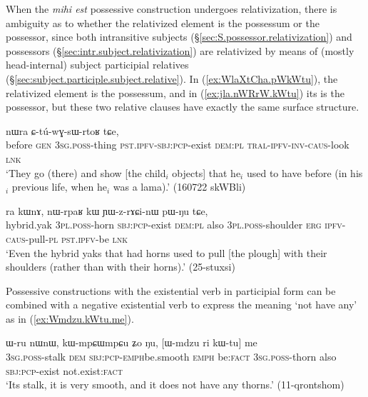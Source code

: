 When the \textit{mihi est} possessive construction undergoes relativization, there is ambiguity as to whether the relativized element is the possessum or the possessor, since both intransitive subjects (§\ref{sec:S.possessor.relativization}) and possessors (§\ref{sec:intr.subject.relativization}) are relativized by means of (mostly head-internal) subject participial relatives (§\ref{sec:subject.participle.subject.relative}). In (\ref{ex:WlaXtCha.pWkWtu}), the relativized element is the possessum, and in (\ref{ex:jla.nWRrW.kWtu}) its is the possessor, but these two relative clauses have exactly the same surface structure.
 
 \begin{exe}
\ex \label{ex:WlaXtCha.pWkWtu}
 nɯra ɕ-tú-wɣ-sɯ-rtoʁ tɕe, \\
before \textsc{gen} \textsc{3sg}.\textsc{poss}-thing \textsc{pst}.\textsc{ipfv}-\textsc{sbj}:\textsc{pcp}-exist \textsc{dem}:\textsc{pl} \textsc{tral}-\textsc{ipfv}-\textsc{inv}-\textsc{caus}-look \textsc{lnk} \\
\glt `They go (there) and show [the child$_i$ objects] that he$_i$ used to have before (in his$_i$ previous life, when he$_i$ was a lama).' (160722 skWBli)
 \end{exe}
 
\begin{exe}
\ex \label{ex:jla.nWRrW.kWtu}
 ra kɯnɤ, nɯ-rpaʁ kɯ ɲɯ-z-rɤɕi-nɯ pɯ-ŋu tɕe, \\
hybrid.yak \textsc{3pl}.\textsc{poss}-horn \textsc{sbj}:\textsc{pcp}-exist \textsc{dem}:\textsc{pl} also \textsc{3pl}.\textsc{poss}-shoulder \textsc{erg} \textsc{ipfv}-\textsc{caus}-pull-\textsc{pl} \textsc{pst}.\textsc{ipfv}-be \textsc{lnk} \\
\glt `Even the hybrid yaks that had horns used to pull [the plough] with their shoulders (rather than with their horns).' (25-stuxsi)
  \end{exe}


Possessive constructions with the existential verb  in participial form can be combined with a negative existential verb  to express the meaning `not have any' as in (\ref{ex:Wmdzu.kWtu.me}).
 
\begin{exe}
\ex \label{ex:Wmdzu.kWtu.me}
\gll  ɯ-ru nɯnɯ, kɯ-mpɕɯ\redp{}mpɕu ʑo ŋu, [ɯ-mdzu ri kɯ-tu] me \\
\textsc{3sg}.\textsc{poss}-stalk \textsc{dem} \textsc{sbj}:\textsc{pcp}-\textsc{emph}\redp{}be.smooth \textsc{emph} be:\textsc{fact} \textsc{3sg}.\textsc{poss}-thorn also \textsc{sbj}:\textsc{pcp}-exist not.exist:\textsc{fact} \\
\glt `Its stalk, it is very smooth, and it does not have any thorns.' (11-qrontshom)
\end{exe} 


